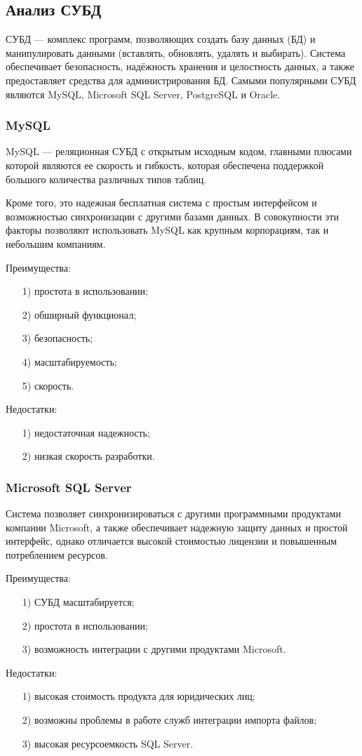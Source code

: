 \subsection{Анализ СУБД}
СУБД — комплекс программ, позволяющих создать базу данных (БД) и манипулировать данными (вставлять, обновлять, удалять и выбирать). Система обеспечивает безопасность, надёжность хранения и целостность данных, а также предоставляет средства для администрирования БД. Самыми популярными СУБД являются MySQL, Microsoft SQL Server, PostgreSQL и Oracle.
\subsubsection{MySQL}
MySQL — реляционная СУБД с открытым исходным кодом, главными плюсами которой являются ее скорость и гибкость, которая обеспечена поддержкой большого количества различных типов таблиц.

Кроме того, это надежная бесплатная система с простым интерфейсом и возможностью синхронизации с другими базами данных. В совокупности эти факторы позволяют использовать MySQL как крупным корпорациям, так и небольшим компаниям.

Преимущества:
\begin{itemize}
	\item[1)] простота в использовании;
	\item[2)] обширный функционал;
	\item[3)] безопасность;
	\item[4)] масштабируемость;
	\item[5)] скорость.    
\end{itemize}
Недостатки:
\begin{itemize}
	\item[1)] недостаточная надежность;
	\item[2)] низкая скорость разработки. 
\end{itemize}
\subsubsection{Microsoft SQL Server}
Система позволяет синхронизироваться с другими программными продуктами компании Microsoft, а также обеспечивает надежную защиту данных и простой интерфейс, однако отличается высокой стоимостью лицензии и повышенным потреблением ресурсов.

Преимущества:
\begin{itemize}
	\item[1)] СУБД масштабируется;
	\item[2)] простота в использовании;
	\item[3)] возможность интеграции с другими продуктами Microsoft.  
\end{itemize}
Недостатки:
\begin{itemize}
	\item[1)] высокая стоимость продукта для юридических лиц; 
	\item[2)] возможны проблемы в работе служб интеграции импорта файлов;
	\item[3)] высокая ресурсоемкость SQL Server.  
\end{itemize}
